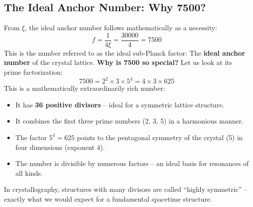 	\subsection{The Ideal Anchor Number: Why 7500?}
	From \(\xi\), the ideal anchor number follows mathematically as a necessity:
	\begin{equation}
		\boxed{f = \frac{1}{4\xi} = \frac{30000}{4} = 7500}
	\end{equation}
	This is the number referred to as the ideal sub-Planck factor: The \textbf{ideal anchor number} of the crystal lattice.
	\textbf{Why is 7500 so special?} Let us look at its prime factorization:
	\begin{equation}
		7500 = 2^2 \times 3 \times 5^4 = 4 \times 3 \times 625
	\end{equation}
	This is a mathematically extraordinarily rich number:
	\begin{itemize}
		\item It has \textbf{36 positive divisors} -- ideal for a symmetric lattice structure.
		\item It combines the first three prime numbers (2, 3, 5) in a harmonious manner.
		\item The factor \(5^4 = 625\) points to the pentagonal symmetry of the crystal (5) in four dimensions (exponent 4).
		\item The number is divisible by numerous factors -- an ideal basis for resonances of all kinds.
	\end{itemize}
	In crystallography, structures with many divisors are called \enquote{highly symmetric} -- exactly what we would expect for a fundamental spacetime structure.
